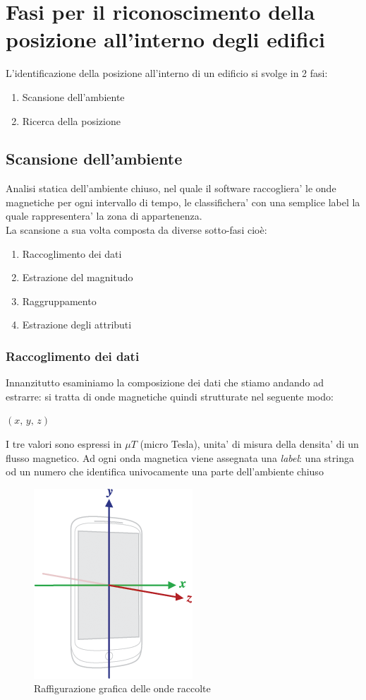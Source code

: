 \chapter*{Fasi per il riconoscimento della posizione all'interno degli edifici}
L'identificazione della posizione all'interno di un edificio si svolge in 2 fasi:
\begin{enumerate}
	\item Scansione dell'ambiente
	\item Ricerca della posizione
\end{enumerate}

\section*{Scansione dell'ambiente}
Analisi statica dell'ambiente chiuso, nel quale il software raccogliera' le onde magnetiche per ogni intervallo di tempo, le classifichera' con una semplice label la quale rappresentera' la zona di appartenenza.\\
La scansione a sua volta composta da diverse sotto-fasi cio\`{e}:
\begin{enumerate}
	\item Raccoglimento dei dati
	\item Estrazione del magnitudo
	\item Raggruppamento
	\item Estrazione degli attributi
\end{enumerate}
\newpage
\subsection*{Raccoglimento dei dati}
Innanzitutto esaminiamo la composizione dei dati che stiamo andando ad estrarre: si tratta di onde magnetiche quindi strutturate nel seguente modo:\\
\begin{center}
	$(x,\, y,\, z)$
\end{center}
I tre valori sono espressi in $ \mu T $ (micro Tesla), unita' di misura della densita' di un flusso magnetico. Ad ogni onda magnetica viene assegnata una \textit{label}: una stringa od un numero che identifica univocamente una parte dell'ambiente chiuso
\begin{figure}[H]
\centering
\includegraphics[width=0.20\linewidth]{./img/axis_magnetic_field.png}
\caption{Raffigurazione grafica delle onde raccolte}
\label{fig:axis_magnetic_field}
\end{figure}

